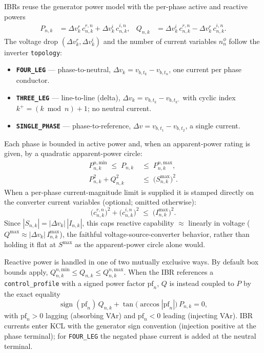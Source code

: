 \documentclass[11pt,a4paper]{article}
\newcommand{\dvr}{\Delta v^r}
\newcommand{\dvi}{\Delta v^i}
\begin{document}
IBRs reuse the generator power model with the per-phase active and reactive
powers
%
\begin{align}
  P_{n,k} &= \dvr_k\,c^{r,n}_{n,k} + \dvi_k\,c^{i,n}_{n,k}, &
  Q_{n,k} &= \dvi_k\,c^{r,n}_{n,k} - \dvr_k\,c^{i,n}_{n,k}.
  \label{eq:inv-pq}
\end{align}
%
The voltage drop $(\dvr_k, \dvi_k)$ and the number of current variables
$n^\phi_n$ follow the inverter \texttt{topology}:
%
\begin{itemize}
  \item \textbf{\texttt{FOUR\_LEG}} --- phase-to-neutral,
        $\Delta v_k = v_{b,t_k} - v_{b,t_n}$, one current per phase conductor.
  \item \textbf{\texttt{THREE\_LEG}} --- line-to-line (delta),
        $\Delta v_k = v_{b,t_k} - v_{b,t_{k^+}}$ with cyclic index
        $k^+ = (k \bmod n) + 1$; no neutral current.
  \item \textbf{\texttt{SINGLE\_PHASE}} --- phase-to-reference,
        $\Delta v = v_{b,t_1} - v_{b,t_2}$, a single current.
\end{itemize}
%
Each phase is bounded in active power and, when an apparent-power rating is
given, by a quadratic apparent-power circle:
%
\begin{align}
  P^{n,\text{min}}_{n,k} \;\leq\; P_{n,k} &\;\leq\; P^{n,\text{max}}_{n,k},
  \label{eq:inv-p}\\
  P_{n,k}^2 + Q_{n,k}^2 &\;\leq\; \bigl(S^{\max}_{n,k}\bigr)^2.
  \label{eq:inv-s}
\end{align}
%
When a per-phase current-magnitude limit is supplied it is stamped directly on
the converter current variables (optional; omitted otherwise):
%
\begin{equation}
  \bigl(c^{r,n}_{n,k}\bigr)^2 + \bigl(c^{i,n}_{n,k}\bigr)^2 \;\leq\;
  \bigl(I^{\max}_{n,k}\bigr)^2.
  \label{eq:inv-i}
\end{equation}
%
Since $|S_{n,k}| = |\Delta v_k|\,|I_{n,k}|$, this caps reactive capability
$\approx$ linearly in voltage ($Q^{\max} \approx |\Delta v_k|\,I^{\max}_{n,k}$),
the faithful voltage-source-converter behavior, rather than holding it flat at
$S^{\max}$ as the apparent-power circle alone would.

Reactive power is handled in one of two mutually exclusive ways.  By default
box bounds apply,
$Q^{n,\text{min}}_{n,k} \leq Q_{n,k} \leq Q^{n,\text{max}}_{n,k}$.  When the
IBR references a \texttt{control\_profile} with a signed power factor
$\mathrm{pf}_n$, $Q$ is instead coupled to $P$ by the exact equality
%
\begin{equation}
  \operatorname{sign}(\mathrm{pf}_n)\,Q_{n,k}
  + \tan\!\bigl(\arccos|\mathrm{pf}_n|\bigr)\,P_{n,k} = 0,
  \label{eq:inv-pf}
\end{equation}
%
with $\mathrm{pf}_n > 0$ lagging (absorbing VAr) and $\mathrm{pf}_n < 0$ leading
(injecting VAr).  IBR currents enter KCL with the generator sign convention
(injection positive at the phase terminal); for \texttt{FOUR\_LEG} the negated
phase current is added at the neutral terminal.
\end{document}

